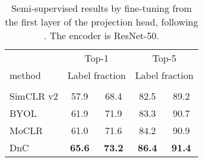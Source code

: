 \documentclass[final]{cvpr}
\newcommand\baseline{MoCLR}
\begin{document}
\begin{table}[h]
\caption{Semi-supervised results by fine-tuning from the first layer of the projection head, following \cite{chen2020simple}. The encoder is ResNet-50.}
\label{tab:semi_results_hidden}
\begin{center}
\begin{small}
\begin{tabular}{lcccc}
\toprule
 & \multicolumn{2}{c}{Top-1} & \multicolumn{2}{c}{Top-5}\\
method & \multicolumn{2}{c}{Label fraction} & \multicolumn{2}{c}{Label fraction}\\
 &  &  &  &  \\
\midrule
SimCLR v2     & 57.9 & 68.4  & 82.5 & 89.2\\
BYOL          & 61.9 & 71.9  & 83.3 & 90.7 \\
\baseline{}   & 61.0 & 71.6  & 84.2 & 90.9 \\
DnC           & \cellcolor{DnCBG}\textbf{65.6} & \cellcolor{DnCBG}\textbf{73.2}    
              & \cellcolor{DnCBG}\textbf{86.4} & \cellcolor{DnCBG}\textbf{91.4} \\
\bottomrule
\end{tabular}
\end{small}
\end{center}
\end{table}
\end{document}
